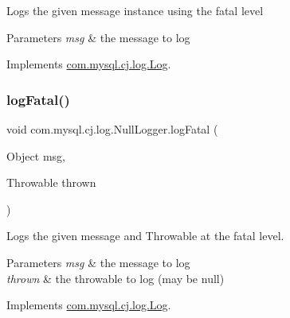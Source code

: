 Logs the given message instance using the \textquotesingle{}fatal\textquotesingle{} level


\begin{DoxyParams}{Parameters}
{\em msg} & the message to log \\
\hline
\end{DoxyParams}


Implements \mbox{\hyperlink{interfacecom_1_1mysql_1_1cj_1_1log_1_1_log_a4f36fdcde6b1c88a4f1ba25a70555e3f}{com.\+mysql.\+cj.\+log.\+Log}}.

\mbox{\label{classcom_1_1mysql_1_1cj_1_1log_1_1_null_logger_a41fac550645e2405ce00932de06fd9cb}} 
\subsubsection{\texorpdfstring{log\+Fatal()}{logFatal()}\hspace{0.1cm}{\footnotesize\ttfamily [2/2]}}
{\footnotesize\ttfamily void com.\+mysql.\+cj.\+log.\+Null\+Logger.\+log\+Fatal (\begin{DoxyParamCaption}\item[{Object}]{msg,  }\item[{Throwable}]{thrown }\end{DoxyParamCaption})}

Logs the given message and Throwable at the \textquotesingle{}fatal\textquotesingle{} level.


\begin{DoxyParams}{Parameters}
{\em msg} & the message to log \\
\hline
{\em thrown} & the throwable to log (may be null) \\
\hline
\end{DoxyParams}


Implements \mbox{\hyperlink{interfacecom_1_1mysql_1_1cj_1_1log_1_1_log_a54cd5e19bf210ab86b373400e2213229}{com.\+mysql.\+cj.\+log.\+Log}}.

\mbox{\label{classcom_1_1mysql_1_1cj_1_1log_1_1_null_logger_a26d58956fed92b00593c66b1d7d3fed0}} 

